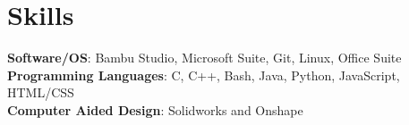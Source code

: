 \section{Skills}
 \begin{itemize}[leftmargin=0.15in, label={}]
    {\item{
     \textbf{Software/OS}{: Bambu Studio, Microsoft Suite, Git, Linux, Office Suite} \\
     \textbf{Programming Languages}{: C, C++, Bash, Java, Python, JavaScript, HTML/CSS} \\
     \textbf{Computer Aided Design}{: Solidworks and Onshape} \\
    }}
\end{itemize}
